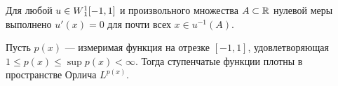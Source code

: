 \begin{prop}
\label{prop:level_derivative}
Для любой $u \in W{}_1^1[-1, 1]$ и произвольного множества $A \subset \mathbb R$ нулевой меры выполнено
$u'(x) = 0$ для почти всех $x \in u^{-1}(A)$.
\end{prop}

\begin{prop}
\label{prop:step_dense_orlicz}
Пусть $p(x)$ --- измеримая функция на отрезке $[-1, 1]$, удовлетворяющая
$1 \le p(x) \le \sup p(x) < \infty$.
Тогда ступенчатые функции плотны в пространстве Орлича $L^{p(x)}$.
\end{prop}
